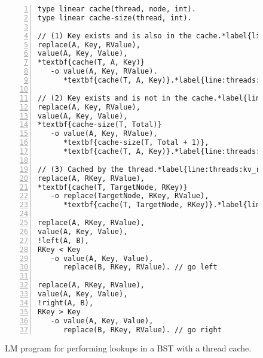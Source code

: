 \begin{figure}[ht]
\begin{Verbatim}[numbers=left,fontsize=\codesize,commandchars=*\{\}]
type linear cache(thread, node, int).
type linear cache-size(thread, int).

// (1) Key exists and is also in the cache.*label{line:threads:kv_rule1_start}
replace(A, Key, RValue),
value(A, Key, Value),
*textbf{cache(T, A, Key)}
   -o value(A, Key, RValue).
      *textbf{cache(T, A, Key)}.*label{line:threads:kv_rule1_end}

// (2) Key exists and is not in the cache.*label{line:threads:kv_rule2_start}
replace(A, Key, RValue),
value(A, Key, Value),
*textbf{cache-size(T, Total)}
   -o value(A, Key, RValue),
      *textbf{cache-size(T, Total + 1)},
      *textbf{cache(T, A, Key)}.*label{line:threads:kv_rule2_end}

// (3) Cached by the thread.*label{line:threads:kv_rule3_start}
replace(A, RKey, RValue),
*textbf{cache(T, TargetNode, RKey)}
   -o replace(TargetNode, RKey, RValue),
      *textbf{cache(T, TargetNode, RKey)}.*label{line:threads:kv_rule3_end}

replace(A, RKey, RValue),
value(A, Key, Value),
!left(A, B),
RKey < Key
   -o value(A, Key, Value),
      replace(B, RKey, RValue). // go left

replace(A, RKey, RValue),
value(A, Key, Value),
!right(A, B),
RKey > Key
   -o value(A, Key, Value),
      replace(B, RKey, RValue). // go right
\end{Verbatim}
\caption{LM program for performing lookups in a BST with a thread cache.}
\label{code:threads:btree_lookup_cache}
\end{figure}


